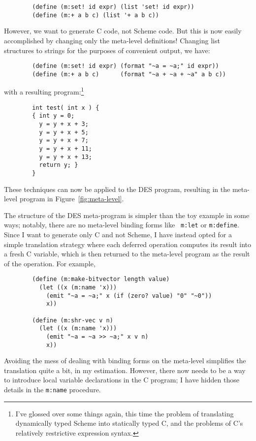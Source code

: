 \begin{verbatim}
        (define (m:set! id expr) (list 'set! id expr))
        (define (m:+ a b c) (list '+ a b c))
\end{verbatim}

However, we want to generate C code, not Scheme code.  But this is now
easily accomplished by changing only the meta-level definitions!
Changing list structures to strings for the purposes of convenient
output, we have:

\begin{verbatim}
        (define (m:set! id expr) (format "~a = ~a;" id expr))
        (define (m:+ a b c)      (format "~a + ~a + ~a" a b c))
\end{verbatim}

\noindent
with a resulting program:\footnote{I've glossed over some things again,
this time the problem of translating dynamically typed Scheme into
statically typed C, and the problems of C's relatively restrictive
expression syntax.}

\begin{verbatim}
        int test( int x ) {
        { int y = 0;
          y = y + x + 3;
          y = y + x + 5;
          y = y + x + 7;
          y = y + x + 11;
          y = y + x + 13;
          return y; }
        }
\end{verbatim}

These techniques can now be applied to the DES program, resulting in
the meta-level program in Figure~\ref{fig:meta-level}. 

The structure of the DES meta-program is simpler than the toy example in
some ways; notably, there are no meta-level binding forms like {\tt
m:let} or {\tt m:define}.  Since I want to generate only C and not
Scheme, I have instead opted for a simple translation strategy where
each deferred operation computes its result into a fresh C variable, which
is then returned to the meta-level program as the result of the
operation.  For example,

\begin{verbatim}
        (define (m:make-bitvector length value)
          (let ((x (m:name 'x)))
            (emit "~a = ~a;" x (if (zero? value) "0" "~0"))
            x))

        (define (m:shr-vec v n)
          (let ((x (m:name 'x)))
            (emit "~a = ~a >> ~a;" x v n)
            x))
\end{verbatim}

Avoiding the mess of dealing with binding forms on the meta-level
simplifies the translation quite a bit, in my estimation.  However,
there now needs to be a way to introduce local variable declarations
in the C program; I have hidden those details in the {\tt m:name}
procedure.

